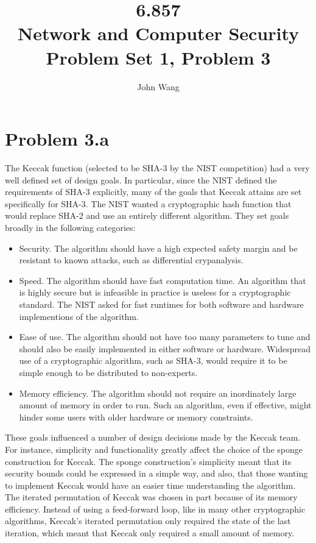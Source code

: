 \documentclass[psamsfonts]{amsart}
\title{6.857 \\
Network and Computer Security \\
Problem Set 1, Problem 3}
\author{John Wang}
\begin{document}
\maketitle

\section{Problem 3.a}

The Keccak function (selected to be SHA-3 by the NIST competition) had a very well defined set of design goals. In particular, since the NIST defined the requirements of SHA-3 explicitly, many of the goals that Keccak attains are set specifically for SHA-3. The NIST wanted a cryptographic hash function that would replace SHA-2 and use an entirely different algorithm. They set goals broadly in the following categories:
\begin{itemize}
  \item Security. The algorithm should have a high expected safety margin and be resistant to known attacks, such as differential crypanalysis.
  \item Speed. The algorithm should have fast computation time. An algorithm that is highly secure but is infeasible in practice is useless for a cryptographic standard. The NIST asked for fast runtimes for both software and hardware implementions of the algorithm.
  \item Ease of use. The algorithm should not have too many parameters to tune and should also be easily implemented in either software or hardware. Widespread use of a cryptographic algorithm, such as SHA-3, would require it to be simple enough to be distributed to non-experts.
  \item Memory efficiency. The algorithm should not require an inordinately large amount of memory in order to run. Such an algorithm, even if effective, might hinder some users with older hardware or memory constraints.
\end{itemize}

These goals influenced a number of design decisions made by the Keccak team. For instance, simplicity and functionality greatly affect the choice of the sponge construction for Keccak. The sponge construction's simplicity meant that its security bounds could be expressed in a simple way, and also, that those wanting to implement Keccak would have an easier time understanding the algorithm. The iterated permutation of Keccak was chosen in part because of its memory efficiency. Instead of using a feed-forward loop, like in many other cryptographic algorithms, Keccak's iterated permutation only required the state of the last iteration, which meant that Keccak only required a small amount of memory.
\end{document}
